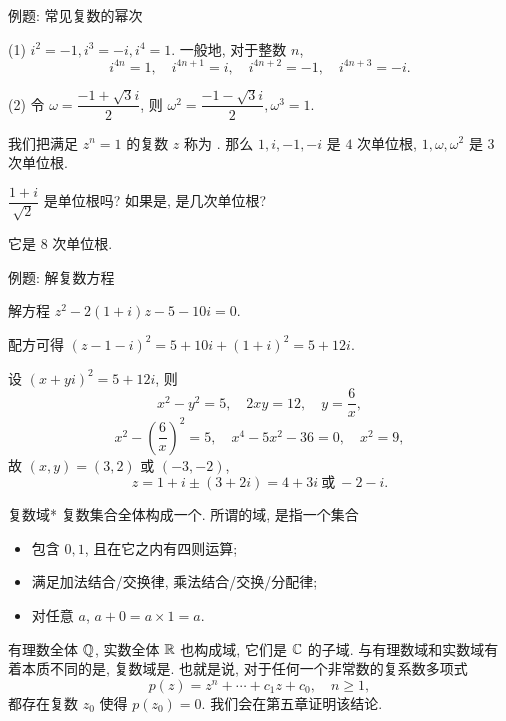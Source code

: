 \begin{frame}{例题: 常见复数的幂次}
\beqskip{5pt}
\begin{example}
(1) $i^2=-1,i^3=-i,i^4=1$.
\onslide<+->
一般地, 对于整数 $n$, 
\[i^{4n}=1,\quad i^{4n+1}=i,\quad i^{4n+2}=-1,\quad i^{4n+3}=-i.\]

\onslide<+->
(2) 令 $\omega=\dfrac{-1+\sqrt 3i}2$, 则 $\omega^2=\dfrac{-1-\sqrt3i}2,\omega^3=1$.
\end{example}
\onslide<+->
我们把满足 $z^n=1$ 的复数 $z$ 称为 .
\onslide<+->
那么 $1,i,-1,-i$ 是 $4$ 次单位根, $1,\omega,\omega^2$ 是 $3$ 次单位根.
\begin{think}
$\dfrac{1+i}{\sqrt2}$ 是单位根吗? 如果是, 是几次单位根?
\end{think}
\vspace{-3pt}
\begin{answer}
它是 $8$ 次单位根.
\end{answer}
\endgroup
\end{frame}


\begin{frame}{例题: 解复数方程}
\beqskip{5pt}
\begin{example}
解方程 $z^2-2(1+i)z-5-10i=0$.
\end{example}
\begin{solution}
\indent
配方可得 $(z-1-i)^2=5+10i+(1+i)^2=5+12i$.

\onslide<+->
\indent
设 $(x+yi)^2=5+12i$, 则
\[x^2-y^2=5,\quad 2xy=12,\quad y=\dfrac 6x,\]
\onslide<+->
\vspace{-5pt}
\[x^2-\left(\frac 6x\right)^2=5,\quad
x^4-5x^2-36=0,\quad x^2=9,\]
\onslide<+->
故 $(x,y)=(3,2)$ 或 $(-3,-2)$,
\onslide<+->
\[z=1+i\pm(3+2i)=4+3i\ \text{或}\ -2-i.\]
\end{solution}
\endgroup
\end{frame}


\begin{frame}{复数域*}
\onslide<+->
复数集合全体构成一个.
\onslide<+->
所谓的域, 是指一个集合
\begin{itemize}
\item 包含 $0,1$, 且在它之内有四则运算;
\item 满足加法结合/交换律, 乘法结合/交换/分配律;
\item 对任意 $a$, $a+0=a\times 1=a$.
\end{itemize}

\onslide<+->
有理数全体 ${\mathbb{Q}}$, 实数全体 ${\mathbb{R}}$ 也构成域, 它们是 ${\mathbb{C}}$ 的子域.
\onslide<+->
与有理数域和实数域有着本质不同的是, 复数域是.
\onslide<+->
也就是说, 对于任何一个非常数的复系数多项式
\[p(z)=z^n+\cdots+c_1z+c_0,\quad n\ge 1,\]
\onslide<+->
都存在复数 $z_0$ 使得 $p(z_0)=0$.
\onslide<+->
我们会在第五章证明该结论.
\end{frame}


